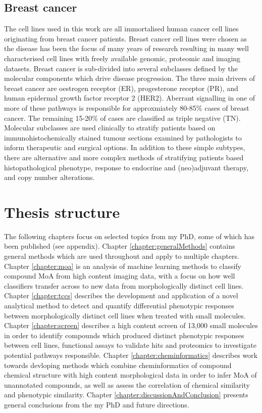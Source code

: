 \documentclass[a4paper,11pt,twoside,openright]{scrbook}
\begin{document}
\subsection{Breast cancer}
The cell lines used in this work are all immortalised human cancer cell lines originating from breast cancer patients.
Breast cancer cell lines were chosen as the disease has been the focus of many years of research resulting in many well characterised cell lines with freely available genomic, proteomic and imaging datasets.
Breast cancer is sub-divided into several subclasses defined by the molecular components which drive disease progression.
The three main drivers of breast cancer are oestrogen receptor (ER), progesterone receptor (PR), and human epidermal growth factor receptor 2 (HER2).
Aberrant signalling in one of more of these pathways is responsible for approxmiately 80-85\% cases of breast cancer.
The remaining 15-20\% of cases are classified as triple negative (TN).
Molecular subclasses are used clinically to stratify patients based on immunohistochemically stained tumour sections examined by pathologists to inform therapeutic and surgical options.
In addition to these simple subtypes, there are alternative and more complex methods of stratifying patients based histopathological phenotype, response to endocrine and (neo)adjuvant therapy, and copy number alterations. \cite{Sims2007}


\section{Thesis structure}
The following chapters focus on selected topics from my PhD, some of which has been published (see appendix).
Chapter \ref{chapter:generalMethods} contains general methods which are used throughout and apply to multiple chapters.
Chapter \ref{chapter:moa} is an analysis of machine learning methods to classify compound MoA from high content imaging data, with a focus on how well classifiers transfer across to new data from morphologically distinct cell lines.
Chapter \ref{chapter:tccs} describes the development and application of a novel analytical method to detect and quantify differential phenotypic responses between morphologically distinct cell lines when treated with small molecules.
Chapter \ref{chapter:screen} describes a high content screen of 13,000 small molecules in order to identify compounds which produced distinct phenotypic responses between cell lines, functional assays to validate hits and proteomics to investigate potential pathways responsible.
Chapter \ref{chapter:cheminformatics} describes work towards devloping methods which combine cheminformatics of compound chemical structure with high content morphological data in order to infer MoA of unannotated compounds, as well as assess the correlation of chemical similarity and phenotypic similarity.
Chapter \ref{chapter:discussionAndConclusion} presents general conclusions from the my PhD and future directions.

\end{document}

